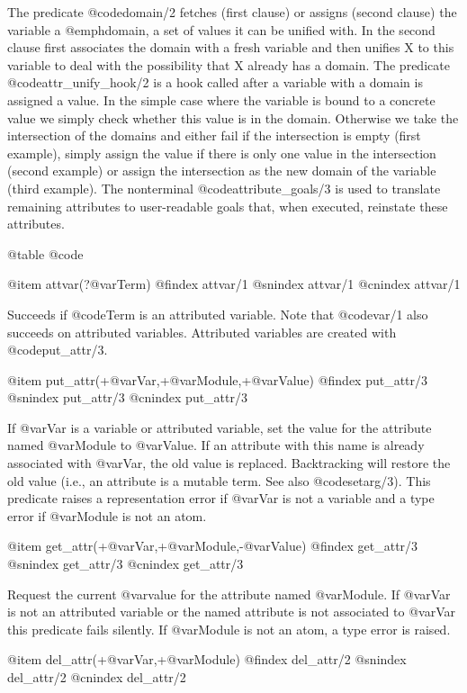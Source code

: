 {{{{{{{{{The predicate @code{domain/2} fetches (first clause) or assigns
(second clause) the variable a @emph{domain}, a set of values it can
be unified with.  In the second clause first associates the domain
with a fresh variable and then unifies X to this variable to deal
with the possibility that X already has a domain. The
predicate @code{attr_unify_hook/2} is a hook called after a variable with
a domain is assigned a value.  In the simple case where the variable
is bound to a concrete value we simply check whether this value is in
the domain. Otherwise we take the intersection of the domains and either
fail if the intersection is empty (first example), simply assign the
value if there is only one value in the intersection (second example) or
assign the intersection as the new domain of the variable (third
example). The nonterminal @code{attribute_goals/3} is used to translate
remaining attributes to user-readable goals that, when executed, reinstate
these attributes.

@table @code

@item attvar(?@var{Term})
@findex attvar/1
@snindex attvar/1
@cnindex attvar/1

Succeeds if @code{Term} is an attributed variable. Note that @code{var/1} also
succeeds on attributed variables.  Attributed variables are created with
@code{put_attr/3}.

@item put_attr(+@var{Var},+@var{Module},+@var{Value})
@findex put_attr/3
@snindex put_attr/3
@cnindex put_attr/3

If @var{Var} is a variable or attributed variable, set the value for the
attribute named @var{Module} to @var{Value}. If an attribute with this
name is already associated with @var{Var}, the old value is replaced.
Backtracking will restore the old value (i.e., an attribute is a mutable
term. See also @code{setarg/3}). This predicate raises a representation error if
@var{Var} is not a variable and a type error if @var{Module} is not an atom.

@item get_attr(+@var{Var},+@var{Module},-@var{Value})
@findex get_attr/3
@snindex get_attr/3
@cnindex get_attr/3

Request the current @var{value} for the attribute named @var{Module}.  If
@var{Var} is not an attributed variable or the named attribute is not
associated to @var{Var} this predicate fails silently.  If @var{Module}
is not an atom, a type error is raised.

@item del_attr(+@var{Var},+@var{Module})
@findex del_attr/2
@snindex del_attr/2
@cnindex del_attr/2

}}}}}}}}}
